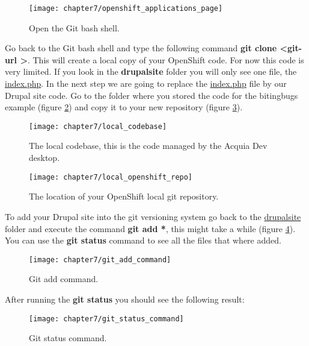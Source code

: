 \begin{figure}[H]
	\centering
	\texttt{[image: chapter7/openshift\_applications\_page]}
	\caption{Open the Git bash shell.}
	\label{fig:openshift_applications_page}
\end{figure}

Go back to the Git bash shell and type the following command \textbf{git clone \textless git-url \textgreater}. This will create a local copy of your OpenShift code. For now this code is very limited. If you look in the \textbf{drupalsite} folder you will only see one file, the \url{index.php}. In the next step we are going to replace the \url{index.php} file by our Drupal site code. 
Go to the folder where you stored the code for the bitingbugs example (figure \ref{fig:local_codebase}) and copy it to your new repository (figure \ref{fig:local_openshift_repo}).

\begin{figure}[H]
	\centering
	\texttt{[image: chapter7/local\_codebase]}
	\caption{The local codebase, this is the code managed by the Acquia Dev desktop.}
	\label{fig:local_codebase}
\end{figure}


 \begin{figure}[H]
 	\centering
 	\texttt{[image: chapter7/local\_openshift\_repo]}
 	\caption{The location of your OpenShift local git repository.}
 	\label{fig:local_openshift_repo}
 \end{figure}
 
 To add your Drupal site into the git versioning system go back to the \url{drupalsite} folder and execute the command \textbf{git add *}, this might take a while (figure \ref{fig:git_add_command}). You can use the \textbf{git status} command to see all the files that where added.
 
 \begin{figure}[H]
 	\centering
 	\texttt{[image: chapter7/git\_add\_command]}
 	\caption{Git add command.}
 	\label{fig:git_add_command}
 \end{figure}
 
 After running the \textbf{git status} you should see the following result:
 
  \begin{figure}[H]
  	\centering
  	\texttt{[image: chapter7/git\_status\_command]}
  	\caption{Git status command.}
  	\label{fig:git_status_command}
  \end{figure}
  
